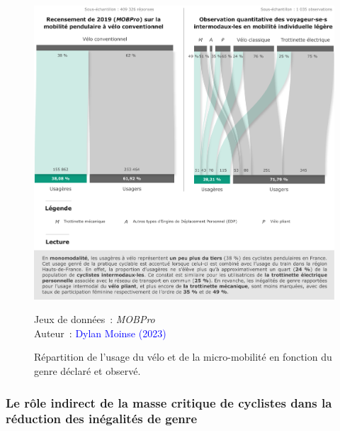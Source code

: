 \begin{refsegment}
    \begin{figure}[h!]\vspace*{4pt}
        \caption{Répartition de l'usage du vélo et de la micro-mobilité en fonction du genre déclaré et observé.}
        \label{fig-chap4:part-modale-genree-mobilite-individuelle-legere}
        \centerline{\includegraphics[width=1\columnwidth]{src/Figures/Chap-4/FR_Part_modale_genre_OLS.pdf}}
        \vspace{5pt}
        \begin{flushright}\scriptsize{
        Jeux de données~: \textsl{MOBPro} \textcolor{blue}{\autocite{insee_documentation_2023}}
        \\
        Auteur~: \textcolor{blue}{Dylan Moinse (2023)}
        }\end{flushright}
    \end{figure}

\subsubsection*{Le rôle indirect de la masse critique de cyclistes dans la réduction des inégalités de genre
    \label{chap4:masse-critique-genre}
    }


\end{refsegment}
